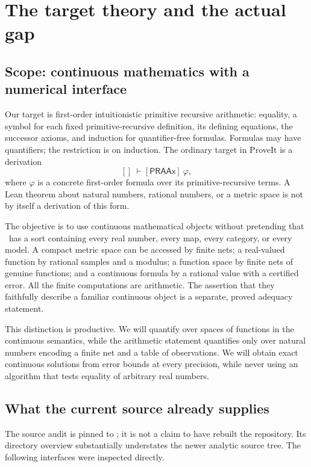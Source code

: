 \section{The target theory and the actual gap}\label{sec:foundation}

\subsection{Scope: continuous mathematics with a numerical interface}

Our target is first-order intuitionistic primitive recursive arithmetic: equality, a symbol for each fixed primitive-recursive definition, its defining equations, the successor axioms, and induction for quantifier-free formulas. Formulas may have quantifiers; the restriction is on induction. The ordinary target in ProveIt is a derivation
\[
  []\ \vdash[\mathsf{PRAAx}]\ \varphi,
\]
where \(\varphi\) is a concrete first-order formula over its primitive-recursive terms. A Lean theorem about natural numbers, rational numbers, or a metric space is not by itself a derivation of this form.

The objective is to use continuous mathematical objects without pretending that \ipra\ has a sort containing every real number, every map, every category, or every model. A compact metric space can be accessed by finite nets; a real-valued function by rational samples and a modulus; a function space by finite nets of genuine functions; and a continuous formula by a rational value with a certified error. All the finite computations are arithmetic. The assertion that they faithfully describe a familiar continuous object is a separate, proved adequacy statement.

This distinction is productive. We will quantify over spaces of functions in the continuous semantics, while the arithmetic statement quantifies only over natural numbers encoding a finite net and a table of observations. We will obtain exact continuous solutions from error bounds at every precision, while never using an algorithm that tests equality of arbitrary real numbers.

\subsection{What the current source already supplies}

The source audit is pinned to \cite{repo}; it is not a claim to have rebuilt the repository. Its directory overview substantially understates the newer analytic source tree. The following interfaces were inspected directly.

